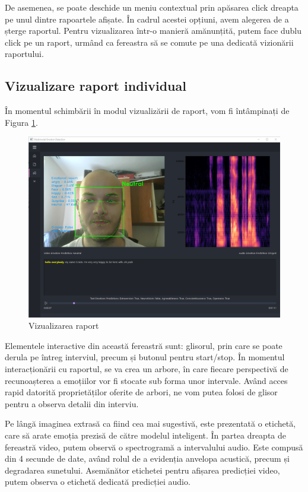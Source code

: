 \documentclass[a4paper, 12pt]{report}
\begin{document}
	De asemenea, se poate deschide un meniu contextual prin apăsarea click dreapta pe unul dintre rapoartele afișate. În cadrul acestei opțiuni, avem alegerea de a șterge raportul. Pentru vizualizarea într-o manieră amănunțită, putem face dublu click pe un raport, urmând ca fereastra să se comute pe una dedicată vizionării raportului.
	
	\clearpage
	\subsection{Vizualizare raport individual}
	În momentul schimbării în modul vizualizării de raport, vom fi întâmpinați de Figura \ref{fig:emotion_report}.
	
	\begin{figure}[H]
		\begin{center}
			\includegraphics[scale=0.35]{images/emotion_report_visualize.png}
		\end{center}
		\caption{Vizualizarea raport}
		\label{fig:emotion_report}
	\end{figure}
	
	Elementele interactive din această fereastră sunt: glisorul, prin care se poate derula pe întreg interviul, precum și butonul pentru start/stop. În momentul interacționării cu raportul, se va crea un arbore, în care fiecare perspectivă de recunoașterea a emoțiilor vor fi stocate sub forma unor intervale. Având acces rapid datorită proprietăților oferite de arbori, ne vom putea folosi de glisor pentru a observa detalii din interviu.
	
	Pe lângă imaginea extrasă ca fiind cea mai sugestivă, este prezentată o etichetă, care să arate emoția prezisă de către modelul inteligent. În partea dreapta de fereastră video, putem observă o spectrogramă a intervalului audio. Este compusă din 4 secunde de date, având rolul de a evidenția anvelopa acustică, precum și degradarea sunetului. Asemănător etichetei pentru afișarea predicției video, putem observa o etichetă dedicată predicției audio.
	
\end{document}
